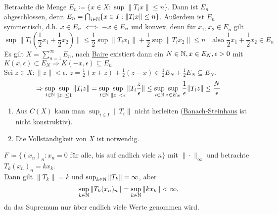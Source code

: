 \begin{beweis}
	Betrachte die Menge $E_{n} \coloneqq \{ x \in X: \sup \| T_{i} x \| \leq n\}$. Dann ist $E_{n}$ abgeschlossen, denn $E_{n} = \bigcap_{i \in \mathbb{N}} \{ x \in I: \| T_{i} x \| \leq n \}$. Außerdem ist $E_{n}$ symmetrisch, d.h. $x \in E_{n} \iff -x \in E_{n}$ und konvex, denn für $x_{1}, x_{2} \in E_{n}$ gilt
		\[ \sup \| T_{i} \left( \frac{1}{2} x_{1} + \frac{1}{2} x_{2} \right) \| \leq \frac{1}{2} \sup \| T_{i} x_{1} \| + \frac{1}{2} \sup \| T_{i} x_{2} \| \leq n \quad \text{also } \frac{1}{2} x_{1} + \frac{1}{2} x_{2} \in E_{n} \]
		Es gilt $X = \sum_{n = 1}^{\infty} E_{n}$, nach \hyperref[satz:9.1-baire]{Baire} existiert dann ein $N \in \mathbb{N}, x \in E_{N}, \epsilon > 0$ mit $K(x, \epsilon) \subset E_{N} \Rightarrow K(-x, \epsilon) \subseteq E_{n}$ \\
		Sei $z \in X: \| z \| < \epsilon$. $z = \frac{1}{2} (x + z) + \frac{1}{2} (z - x) \in \frac{1}{2} E_{N} + \frac{1}{2} E_{N} \subseteq E_{N}$. 
		\[ \Rightarrow \sup_{i \in \mathbb{N}} \sup_{\| z \| \leq 1} \| T_{i} z \| = \sup_{i \in \mathbb{N}} \sup_{\| z \| < \epsilon} \| T_{i} \frac{z}{\epsilon} \| \leq \sup_{i \in \mathbb{N}} \sup_{z \in E_{N}} \frac{1}{\epsilon} \| T_{i} z \| \leq \frac{N}{\epsilon} \]	
\end{beweis}


\begin{bemerkung}  \label{bem:9.6}
	\begin{enumerate}[label=\alph*\upshape)]
		\item Aus $C(X)$ kann man $\sup_{i \in I} \| T_{i} \|$ nicht herleiten (\hyperref[satz:9.5-Banach-Steinhaus]{Banach-Steinhaus} ist nicht konstruktiv).
		\item Die Vollständigkeit von $X$ ist notwendig.
	\end{enumerate}	
\end{bemerkung}


\begin{beispiel*}
$F \coloneqq \{ (x_{n})_{n}: x_{n} = 0$ für alle, bis auf endlich viele $n \}$ mit $\| \cdot \|_{\infty}$ und betrachte $T_{k} (x_{n})_{n} = k x_{k}$. \\ 
	Dann gilt $\| T_{k} \| = k$ und $\sup_{k \in \mathbb{N}} \| T_{k} \| = \infty$, aber 
	\[ \sup_{k \in \mathbb{N}} \| T_{k} (x_{n})_{n} \| = \sup_{k \in \mathbb{N}} \| k x_{k} \| < \infty, \]
	da das Supremum nur über endlich viele Werte genommen wird.
\end{beispiel*}



